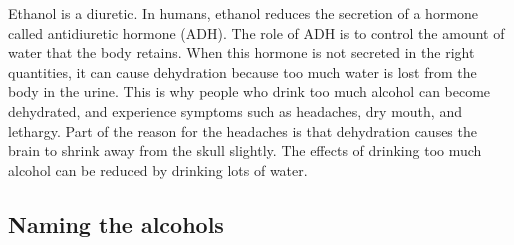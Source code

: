 \begin{IFact}{
Ethanol is a diuretic. In humans, ethanol reduces the secretion of a hormone called antidiuretic hormone (ADH). The role of ADH is to control the amount of water that the body retains. When this hormone is not secreted in the right quantities, it can cause dehydration because too much water is lost from the body in the urine. This is why people who drink too much alcohol can become dehydrated, and experience symptoms such as headaches, dry mouth, and lethargy. Part of the reason for the headaches is that dehydration causes the brain to shrink away from the skull slightly. The effects of drinking too much alcohol can be reduced by drinking lots of water.}
\end{IFact}

\subsection{Naming the alcohols}
\label{subsec:om:alcoholnaming}

